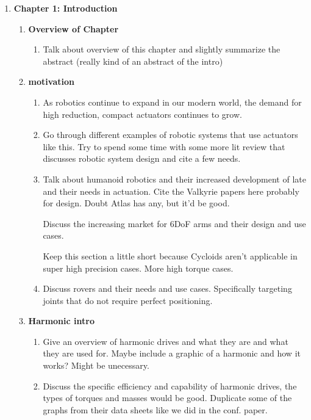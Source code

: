 \begin{enumerate}
	\item \textbf{Chapter 1: Introduction} 
	\begin{enumerate}
		\item \textbf{Overview of Chapter }
		\begin{enumerate}
			\item 
			Talk about overview of this chapter and slightly summarize the abstract (really kind of an abstract of the intro) 
		\end{enumerate}
		\item \textbf{motivation}
		\begin{enumerate}
			\item
			As robotics continue to expand in our modern world, the demand for high reduction, compact actuators continues to grow. 
			\item
			Go through different examples of robotic systems that use actuators like this. Try to spend some time with some more lit review that discusses robotic system design and cite a few needs. 
			\item
			Talk about humanoid robotics and their increased development of late and their needs in actuation. Cite the Valkyrie papers here probably for design. Doubt Atlas has any, but it'd be good. 

			Discuss the increasing market for 6DoF arms and their design and use cases. 

			Keep this section a little short because Cycloids aren't applicable in super high precision cases. More high torque cases. 
			\item
			Discuss rovers and their needs and use cases. Specifically targeting joints that do not require perfect positioning. 
		\end{enumerate}

		\item \textbf{Harmonic intro}
		\begin{enumerate}
			\item
			Give an overview of harmonic drives and what they are and what they are used for. Maybe include a graphic of a harmonic and how it works? Might be unecessary. 
			\item
			Discuss the specific efficiency and capability of harmonic drives, the types of torques and masses would be good. Duplicate some of the graphs from their data sheets like we did in the conf. paper. 
		\end{enumerate}


\end{enumerate}
\end{enumerate}
